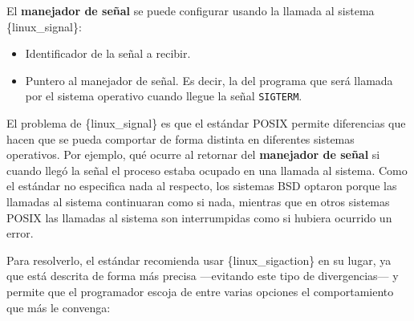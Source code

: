 El \textbf{manejador de señal} se puede configurar usando la llamada al
sistema \{linux\_signal\}:

\begin{Shaded}
\begin{Highlighting}[]
\OperatorTok{(}
\OperatorTok{,} 
    \OperatorTok{\&}
\OperatorTok{);}
\end{Highlighting}
\end{Shaded}

\begin{itemize}
\item
  Identificador de la señal a recibir.
\item
  Puntero al manejador de señal. Es decir, la del programa que será
  llamada por el sistema operativo cuando llegue la señal
  \texttt{SIGTERM}.
\end{itemize}

El problema de \{linux\_signal\} es que el estándar POSIX permite
diferencias que hacen que se pueda comportar de forma distinta en
diferentes sistemas operativos. Por ejemplo, qué ocurre al retornar del
\textbf{manejador de señal} si cuando llegó la señal el proceso estaba
ocupado en una llamada al sistema. Como el estándar no especifica nada
al respecto, los sistemas BSD optaron porque las llamadas al sistema
continuaran como si nada, mientras que en otros sistemas POSIX las
llamadas al sistema son interrumpidas como si hubiera ocurrido un error.

Para resolverlo, el estándar recomienda usar \{linux\_sigaction\} en su
lugar, ya que está descrita de forma más precisa ---evitando este tipo
de divergencias--- y permite que el programador escoja de entre varias
opciones el comportamiento que más le convenga:

\begin{Shaded}
\begin{Highlighting}[]
\OperatorTok{=} \OperatorTok{\{}
    \OperatorTok{=} \OperatorTok{\&}\OperatorTok{,} 
    \OperatorTok{=}\OperatorTok{,}   
    \OperatorTok{=} \OperatorTok{,}           
    \OperatorTok{=}\OperatorTok{,} 
\OperatorTok{\}}

\OperatorTok{(}
\OperatorTok{,} 
    \OperatorTok{\&}\OperatorTok{,}    
\OperatorTok{);}
\end{Highlighting}
\end{Shaded}

